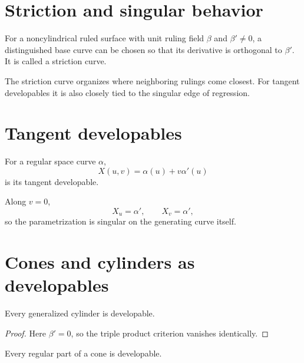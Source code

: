 \section{Striction and singular behavior}

\begin{definition}\label{def:vii18-striction}
For a noncylindrical ruled surface with unit ruling field \(\beta\) and \(\beta'\neq0\), a distinguished base curve can be chosen so that its derivative is orthogonal to \(\beta'\). It is called a striction curve.
\end{definition}

\begin{remark}
The striction curve organizes where neighboring rulings come closest. For tangent developables it is also closely tied to the singular edge of regression.
\end{remark}

\section{Tangent developables}

\begin{definition}\label{def:vii18-tangent-developable}
For a regular space curve \(\alpha\),
\[
X(u,v)=\alpha(u)+v\alpha'(u)
\]
is its tangent developable.
\end{definition}

\begin{proposition}\label{prop:vii18-tangent-singular}
Along \(v=0\),
\[
X_u=\alpha',\qquad X_v=\alpha',
\]
so the parametrization is singular on the generating curve itself.
\end{proposition}

\section{Cones and cylinders as developables}

\begin{proposition}[Cylinders]\label{prop:vii18-cyl-developable}
Every generalized cylinder is developable.
\end{proposition}

\begin{proof}
Here \(\beta'=0\), so the triple product criterion vanishes identically.
\end{proof}

\begin{proposition}[Cones]\label{prop:vii18-cone-developable}
Every regular part of a cone is developable.
\end{proposition}

